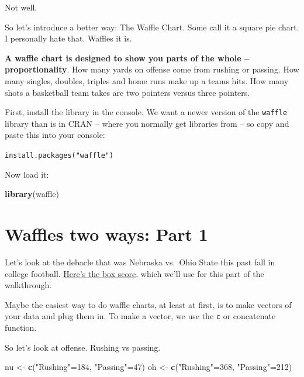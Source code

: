 \documentclass[
]{book}
\newenvironment{Shaded}{\begin{snugshade}}{\end{snugshade}}
\newcommand{\DecValTok}[1]{\textcolor[rgb]{0.00,0.00,0.81}{#1}}
\newcommand{\KeywordTok}[1]{\textcolor[rgb]{0.13,0.29,0.53}{\textbf{#1}}}
\newcommand{\NormalTok}[1]{#1}
\newcommand{\StringTok}[1]{\textcolor[rgb]{0.31,0.60,0.02}{#1}}
\begin{document}
Not well.

So let's introduce a better way: The Waffle Chart. Some call it a square pie chart. I personally hate that. Waffles it is.

\textbf{A waffle chart is designed to show you parts of the whole -- proportionality}. How many yards on offense come from rushing or passing. How many singles, doubles, triples and home runs make up a teams hits. How many shots a basketball team takes are two pointers versus three pointers.

First, install the library in the console. We want a newer version of the \texttt{waffle} library than is in CRAN -- where you normally get libraries from -- so copy and paste this into your console:

\texttt{install.packages("waffle")}

Now load it:

\begin{Shaded}
\begin{Highlighting}[]
\KeywordTok{library}\NormalTok{(waffle)}
\end{Highlighting}
\end{Shaded}

\hypertarget{waffles-two-ways-part-1}{%
\section{Waffles two ways: Part 1}\label{waffles-two-ways-part-1}}

Let's look at the debacle that was Nebraska vs.~Ohio State this past fall in college football. \href{https://www.espn.com/college-football/matchup?gameId=401112241}{Here's the box score}, which we'll use for this part of the walkthrough.

Maybe the easiest way to do waffle charts, at least at first, is to make vectors of your data and plug them in. To make a vector, we use the \texttt{c} or concatenate function.

So let's look at offense. Rushing vs passing.

\begin{Shaded}
\begin{Highlighting}[]
\NormalTok{nu <-}\StringTok{ }\KeywordTok{c}\NormalTok{(}\StringTok{"Rushing"}\NormalTok{=}\DecValTok{184}\NormalTok{, }\StringTok{"Passing"}\NormalTok{=}\DecValTok{47}\NormalTok{)}
\NormalTok{oh <-}\StringTok{ }\KeywordTok{c}\NormalTok{(}\StringTok{"Rushing"}\NormalTok{=}\DecValTok{368}\NormalTok{, }\StringTok{"Passing"}\NormalTok{=}\DecValTok{212}\NormalTok{)}
\end{Highlighting}
\end{Shaded}
\end{document}
